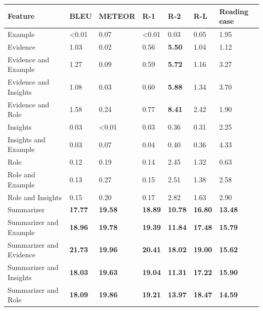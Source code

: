 \begin{tabular}{|l|l|l|l|l|l|l|}
\hline
\textbf{Feature} & BLEU & METEOR & R-1 & R-2 & R-L & Reading ease \\
 \hline
 Example & \textless{}0.01 & 0.07 & \textless{}0.01 & 0.03 & 0.05 & 1.95 \\
 \hline
 Evidence & 1.03 & 0.02 & 0.56 & \textbf{5.50} & 1.04 & 1.12 \\
 \hline
 Evidence and Example & 1.27 & 0.09 & 0.59 & \textbf{5.72} & 1.16 & 3.27 \\
 \hline
 Evidence and Insights & 1.08 & 0.03 & 0.60 & \textbf{5.88} & 1.34 & 3.70 \\
 \hline
 Evidence and Role & 1.58 & 0.24 & 0.77 & \textbf{8.41} & 2.42 & 1.90 \\
 \hline
 Insights & 0.03 & \textless{}0.01 & 0.03 & 0.36 & 0.31 & 2.25 \\
 \hline
 Insights and Example & 0.03 & 0.07 & 0.04 & 0.40 & 0.36 & 4.33 \\
 \hline
 Role & 0.12 & 0.19 & 0.14 & 2.45 & 1.32 & 0.63 \\
 \hline
 Role and Example & 0.13 & 0.27 & 0.15 & 2.51 & 1.38 & 2.58 \\
 \hline
 Role and Insights & 0.15 & 0.20 & 0.17 & 2.82 & 1.63 & 2.90 \\
 \hline
 Summarizer & \textbf{17.77} & \textbf{19.58} & \textbf{18.89} & \textbf{10.78} & \textbf{16.80} & \textbf{13.48} \\
 \hline
 Summarizer and Example & \textbf{18.96} & \textbf{19.78} & \textbf{19.39} & \textbf{11.84} & \textbf{17.48} & \textbf{15.79} \\
 \hline
 Summarizer and Evidence & \textbf{21.73} & \textbf{19.96} & \textbf{20.41} & \textbf{18.02} & \textbf{19.00} & \textbf{15.62} \\
 \hline
 Summarizer and Insights & \textbf{18.03} & \textbf{19.63} & \textbf{19.04} & \textbf{11.31} & \textbf{17.22} & \textbf{15.90} \\
 \hline
 Summarizer and Role & \textbf{18.09} & \textbf{19.86} & \textbf{19.21} & \textbf{13.97} & \textbf{18.47} & \textbf{14.59} \\
\hline
\end{tabular}
